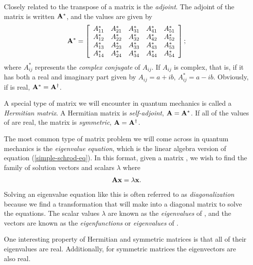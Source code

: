 Closely related to the transpose of a matrix is the
\emph{adjoint}. The adjoint of the matrix  is written
$\mathbf{A}^*$, and the values are given by
\begin{equation}
	\mathbf{A}^* = 
	\left[\begin{array}{ccccc}
		A_{11}^* & A_{21}^* & A_{31}^* & A_{41}^* & A_{51}^*\\
		A_{12}^* & A_{22}^* & A_{32}^* & A_{42}^* & A_{52}^*\\
		A_{13}^* & A_{23}^* & A_{33}^* & A_{43}^* & A_{53}^*\\
		A_{14}^* & A_{24}^* & A_{34}^* & A_{44}^* & A_{54}^*\\
	\end{array}\right];
\end{equation}
where $A_{ij}^*$ represents the \emph{complex conjugate} of
$A_{ij}$. If $A_{ij}$ is complex, that is, if it has both a real and
imaginary part given by $A_{ij} = a+ib$, $A_{ij}^* = a-ib$. Obviously,
if  is real, $\mathbf{A}^* = \mathbf{A}^\dag$.

A special type of matrix we will encounter in quantum mechanics is
called a \emph{Hermitian matrix}. A Hermitian matrix is
\emph{self-adjoint}, $\mathbf{A} = \mathbf{A}^*$. If all of the
values of  are real, the matrix is \emph{symmetric},
$\mathbf{A} = \mathbf{A}^\dag$. 


The most common type of matrix problem we will come across in quantum
mechanics is the \emph{eigenvalue equation}, which is the linear algebra
version of equation (\ref{simple-schrod-eq}). In this format, given a
matrix , we wish to find the family of solution vectors
 and scalars $\lambda$ where
\begin{equation}
	\mathbf{A}\mathbf{x} = \lambda\mathbf{x}.
\end{equation}
Solving an eigenvalue equation like this is often referred to as
\emph{diagonalization} because we find a transformation that will make
 into a diagonal matrix to solve the equations. The scalar
values $\lambda$ are known as the \emph{eigenvalues} of ,
and the vectors  are known as the \emph{eigenfunctions} or
\emph{eigenvalues} of .

One interesting property of Hermitian and symmetric matrices is that
all of their eigenvalues are real. Additionally, for symmetric
matrices the eigenvectors are also real.

